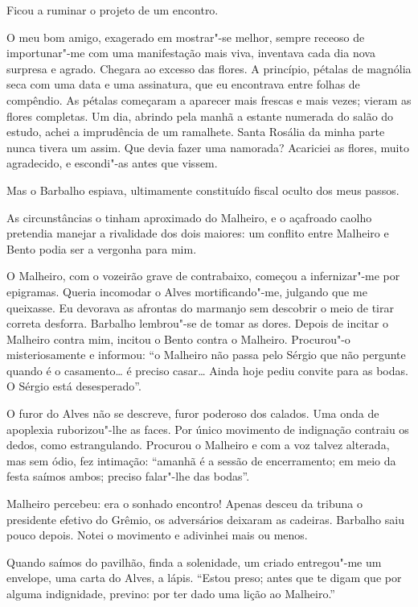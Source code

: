 Ficou a ruminar o projeto de um encontro. 

O meu bom amigo, exagerado em
mostrar"-se melhor, sempre receoso de importunar"-me com uma
manifestação mais viva, inventava cada dia nova surpresa e agrado.
Chegara ao excesso das flores. A princípio, pétalas de magnólia seca
com uma data e uma assinatura, que eu encontrava entre folhas de
compêndio. As pétalas começaram a aparecer mais frescas e mais vezes;
vieram as flores completas. Um dia, abrindo pela manhã a estante
numerada do salão do estudo, achei a imprudência de um ramalhete. Santa
Rosália da minha parte nunca tivera um assim. Que devia fazer uma
namorada? Acariciei as flores, muito agradecido, e escondi"-as antes
que vissem. 

Mas o Barbalho espiava, ultimamente constituído fiscal
oculto dos meus passos.

As circunstâncias o tinham aproximado do Malheiro, e o açafroado caolho
pretendia manejar a rivalidade dos dois maiores: um conflito entre
Malheiro e Bento podia ser a vergonha para mim. 

O Malheiro, com o
vozeirão grave de contrabaixo, começou a infernizar"-me por epigramas.
Queria incomodar o Alves mortificando"-me, julgando que me queixasse.
Eu devorava as afrontas do marmanjo sem descobrir o meio de tirar
correta desforra. Barbalho lembrou"-se de tomar as dores. Depois de
incitar o Malheiro contra mim, incitou o Bento contra o Malheiro.
Procurou"-o misteriosamente e informou: ``o Malheiro não passa pelo
Sérgio que não pergunte quando é o casamento\ldots{} é preciso casar\ldots{}
Ainda hoje pediu convite para as bodas. O Sérgio está desesperado''.

O furor do Alves não se descreve, furor poderoso dos calados. Uma onda de
apoplexia ruborizou"-lhe as faces. Por único movimento de indignação
contraiu os dedos, como estrangulando. Procurou o Malheiro e com a voz
talvez alterada, mas sem ódio, fez intimação: ``amanhã é a sessão de
encerramento; em meio da festa saímos ambos; preciso falar"-lhe das
bodas''. 

Malheiro percebeu: era o sonhado encontro! Apenas desceu da
tribuna o presidente efetivo do Grêmio, os adversários deixaram as
cadeiras. Barbalho saiu pouco depois. Notei o movimento e adivinhei
mais ou menos. 

Quando saímos do pavilhão, finda a solenidade, um criado
entregou"-me um envelope, uma carta do Alves, a lápis. ``Estou preso;
antes que te digam que por alguma indignidade, previno: por ter dado
uma lição ao Malheiro.'' 


